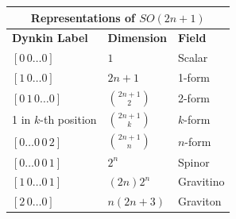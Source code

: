\vspace{1em}

\begin{center}
\begin{tabular}{p{} p{} p{}}
\toprule
\multicolumn{3}{c}{\textbf{Representations of } $SO(2n+1)$} \\
\midrule
\textbf{Dynkin Label} & \textbf{Dimension} & \textbf{Field} \\
\midrule
$[0\,0\ldots 0]$                     & $1$                    & Scalar \\
$[1\,0\ldots 0]$                     & $2n+1$                 & 1-form \\
$[0\,1\,0\ldots 0]$                  & $\binom{2n+1}{2}$      & 2-form \\
1 in $k$-th position                 & $\binom{2n+1}{k}$      & $k$-form \\
$[0\ldots 0\,0\,2]$                  & $\binom{2n+1}{n}$      & $n$-form \\
$[0\ldots 0\,0\,1]$                  & $2^{n}$              & Spinor \\
$[1\,0\ldots 0\,1]$                  & $(2n)2^{n}$          & Gravitino \\
$[2\,0\ldots 0]$                     & $n(2n+3)$              & Graviton \\
\bottomrule
\end{tabular}
\end{center}
